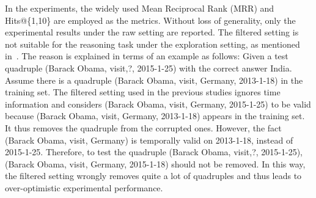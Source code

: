 \documentclass[11pt,a4paper]{article}
\begin{document}
In the experiments, the widely used Mean Reciprocal Rank (MRR) and Hits@\{1,10\}
are employed as the metrics. Without loss of generality, only the experimental
results under the raw setting are reported. The filtered setting is
not suitable for the reasoning task under the exploration setting, as mentioned
in~\cite{han2020graph, ding2021temporal, jain2020temporal}. 
The reason is explained in
terms of an example as follows: Given a test quadruple (Barack Obama, visit,?,  2015-1-25) with the correct answer India. Assume there is a quadruple (Barack
Obama, visit, Germany, 2013-1-18) in the training set. The filtered setting
used in the previous studies ignores time information and considers (Barack
Obama, visit, Germany, 2015-1-25) to be valid because (Barack Obama, visit,
Germany, 2013-1-18) appears in the training set. It thus removes the quadruple
from the corrupted ones. However, the fact (Barack Obama, visit, Germany) is
temporally valid on 2013-1-18, instead of 2015-1-25. Therefore, to test
the quadruple (Barack Obama, visit,?, 2015-1-25), (Barack Obama, visit,
Germany, 2015-1-18) should not be removed. In this way, the filtered setting
wrongly removes quite a lot of quadruples and thus leads to over-optimistic
experimental performance.

  
\end{document}
